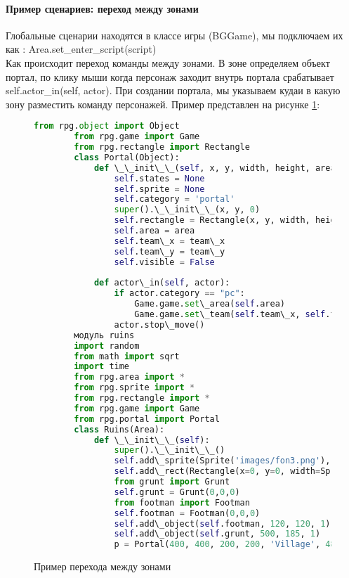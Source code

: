 \paragraph{Пример сценариев: переход между зонами}
Глобальные сценарии находятся в классе игры (BGGame), мы подключаем их как :
Area.set\_enter\_script(script)\\
Как происходит переход команды между зонами.
В зоне определяем объект портал, по клику мыши когда персонаж заходит внутрь портала срабатывает self.actor\_in(self, actor). При создании портала, мы указываем кудаи в какую зону разместить команду персонажей.
Пример представлен на рисунке \ref{portal:image}:
\begin{figure}[H]
	\begin{lstlisting}[language=Python]
		from rpg.object import Object
		from rpg.game import Game
		from rpg.rectangle import Rectangle	
		class Portal(Object):
			def \_\_init\_\_(self, x, y, width, height, area, team\_x, team\_y):
				self.states = None
				self.sprite = None
				self.category = 'portal'
				super().\_\_init\_\_(x, y, 0)
				self.rectangle = Rectangle(x, y, width, height)
				self.area = area
				self.team\_x = team\_x
				self.team\_y = team\_y
				self.visible = False
			
			def actor\_in(self, actor):
				if actor.category == "pc":
					Game.game.set\_area(self.area)
					Game.game.set\_team(self.team\_x, self.team\_y, 100)
				actor.stop\_move()		
		модуль ruins
		import random
		from math import sqrt
		import time
		from rpg.area import *
		from rpg.sprite import *
		from rpg.rectangle import *
		from rpg.game import Game
		from rpg.portal import Portal
		class Ruins(Area):
			def \_\_init\_\_(self):
				super().\_\_init\_\_()
				self.add\_sprite(Sprite('images/fon3.png'), 590, 400, 0)
				self.add\_rect(Rectangle(x=0, y=0, width=Sprite('images/fon3.png').image.width(), height=Sprite('images/fon3.png').image.height()))
				from grunt import Grunt
				self.grunt = Grunt(0,0,0)
				from footman import Footman
				self.footman = Footman(0,0,0)
				self.add\_object(self.footman, 120, 120, 1)
				self.add\_object(self.grunt, 500, 185, 1)
				p = Portal(400, 400, 200, 200, 'Village', 480, 100)
	\end{lstlisting}  
	\caption{Пример перехода между зонами}
	\label{portal:image}
\end{figure}

